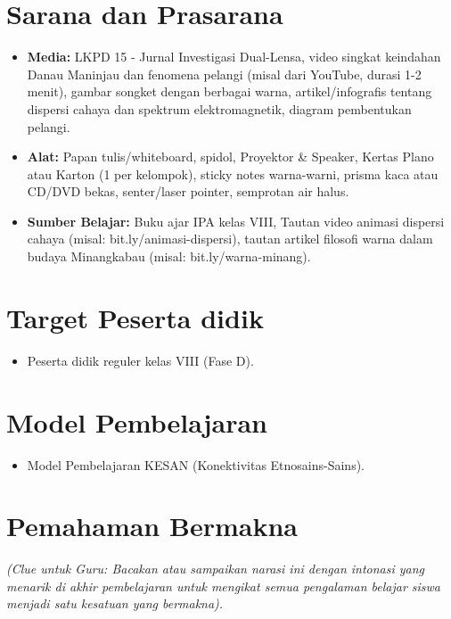 \documentclass[12pt,a4paper]{article}
\begin{document}
\section{Sarana dan Prasarana}

\begin{itemize}
\item \textbf{Media:} LKPD 15 - Jurnal Investigasi Dual-Lensa, video singkat keindahan Danau Maninjau dan fenomena pelangi (misal dari YouTube, durasi 1-2 menit), gambar songket dengan berbagai warna, artikel/infografis tentang dispersi cahaya dan spektrum elektromagnetik, diagram pembentukan pelangi.
\item \textbf{Alat:} Papan tulis/whiteboard, spidol, Proyektor \& Speaker, Kertas Plano atau Karton (1 per kelompok), sticky notes warna-warni, prisma kaca atau CD/DVD bekas, senter/laser pointer, semprotan air halus.
\item \textbf{Sumber Belajar:} Buku ajar IPA kelas VIII, Tautan video animasi dispersi cahaya (misal: bit.ly/animasi-dispersi), tautan artikel filosofi warna dalam budaya Minangkabau (misal: bit.ly/warna-minang).
\end{itemize}

\section{Target Peserta didik}

\begin{itemize}
\item Peserta didik reguler kelas VIII (Fase D).
\end{itemize}

\section{Model Pembelajaran}

\begin{itemize}
\item Model Pembelajaran KESAN (Konektivitas Etnosains-Sains).
\end{itemize}

\section{Pemahaman Bermakna}
\textit{(Clue untuk Guru: Bacakan atau sampaikan narasi ini dengan intonasi yang menarik di akhir pembelajaran untuk mengikat semua pengalaman belajar siswa menjadi satu kesatuan yang bermakna).}
\end{document}
